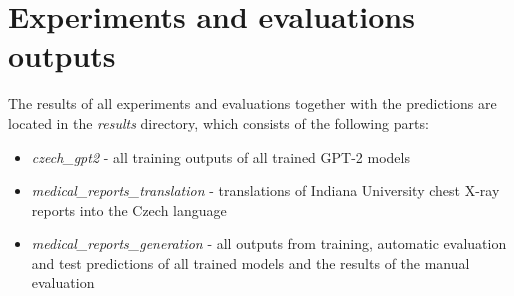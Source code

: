 \documentclass[12pt,a4paper]{report}
\let\openright=\clearpage
\begin{document}
\section{Experiments and evaluations outputs}
\label{add:Outputs}
The results of all experiments and evaluations together with the predictions are located in the \textit{results} directory, which consists of the following parts:
\begin{itemize}
	\item \textit{czech\_gpt2} - all training outputs of all trained GPT-2 models
	\item \textit{medical\_reports\_translation} - translations of Indiana University chest X-ray reports into the Czech language
	\item \textit{medical\_reports\_generation} - all outputs from training, automatic evaluation and test predictions of all trained models and the results of the manual evaluation
\end{itemize}

\openright
\end{document}
